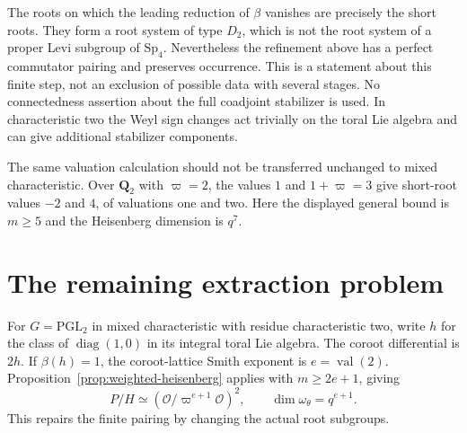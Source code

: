 \documentclass[10pt]{amsart}
\newcommand{\Ocal}{\mathcal O}
\newcommand{\val}{\operatorname{val}}
\begin{document}
The roots on which the leading reduction of $\beta$ vanishes are precisely the
short roots. They form a root system of type $D_2$, which is not the root system
of a proper Levi subgroup of $\mathrm{Sp}_4$. Nevertheless the refinement above
has a perfect commutator pairing and preserves occurrence. This is a statement
about this finite step, not an exclusion of possible data with several stages.
No connectedness assertion about the full coadjoint stabilizer is used. In
characteristic two the Weyl sign changes act trivially on the toral Lie algebra
and can give additional stabilizer components.

The same valuation calculation should not be transferred unchanged to mixed
characteristic. Over $\mathbf Q_2$ with $\varpi=2$, the values $1$ and $1+\varpi=3$
give short-root values $-2$ and $4$, of valuations one and two. Here the displayed
general bound is $m\geq5$ and the Heisenberg dimension is $q^7$.































\section{The remaining extraction problem}

For $G=\mathrm{PGL}_2$ in mixed characteristic with residue characteristic two,
write $h$ for the class of $\operatorname{diag}(1,0)$ in its integral toral Lie
algebra. The coroot differential is $2h$. If $\beta(h)=1$, the coroot-lattice
Smith exponent is $e=\val(2)$. Proposition~\ref{prop:weighted-heisenberg} applies
with $m\geq2e+1$, giving
\[
 P/H\simeq(\Ocal/\varpi^{e+1}\Ocal)^2,
 \qquad\dim\omega_\theta=q^{e+1}.
\]
This repairs the finite pairing by changing the actual root subgroups.
\end{document}
